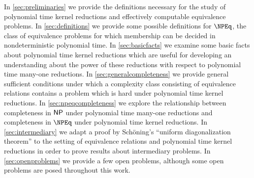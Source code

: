 In \autoref{sec:preliminaries} we provide the definitions necessary for the study of polynomial time kernel reductions and effectively computable equivalence problems.
In \autoref{sec:definitions} we provide some possible definitions for $\NPEq$, the class of equivalence problems for which membership can be decided in nondeterministic polynomial time.
In \autoref{sec:basicfacts} we examine some basic facts about polynomial time kernel reductions which are useful for developing an understanding about the power of these reductions with respect to polynomial time many-one reductions.
In \autoref{sec:generalcompleteness} we provide general sufficient conditions under which a complexity class consisting of equivalence relations contains a problem which is hard under polynomial time kernel reductions.
In \autoref{sec:npeqcompleteness} we explore the relationship between completeness in ${\mathsf{NP}}$ under polynomial time many-one reductions and completeness in $\NPEq$ under polynomial time kernel reductions.
In \autoref{sec:intermediary} we adapt a proof by Sch\"{o}ning's ``uniform diagonalization theorem'' to the setting of equivalence relations and polynomial time kernel reductions in order to prove results about intermediary problems.
In \autoref{sec:openproblems} we provide a few open problems, although some open problems are posed throughout this work.
